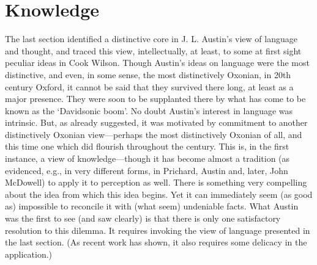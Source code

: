 \section{Knowledge} %
\label{sec:knowledge}


The last section identified a distinctive core in J. L. Austin’s view of language and thought, and traced this view, intellectually, at least, to some at first sight peculiar ideas in Cook Wilson. Though Austin’s ideas on language were the most distinctive, and even, in some sense, the most distinctively Oxonian, in 20th century Oxford, it cannot be said that they survived there long, at least as a major presence. They were soon to be supplanted there by what has come to be known as the ‘Davidsonic boom’. No doubt Austin’s interest in language was intrinsic. But, as already suggested, it was motivated by commitment to another distinctively Oxonian view---perhaps the most distinctively Oxonian of all, and this time one which did flourish throughout the century. This is, in the first instance, a view of knowledge---though it has become almost a tradition (as evidenced, e.g., in very different forms, in Prichard, Austin and, later, John McDowell) to apply it to perception as well. There is something very compelling about the idea from which this idea begins. Yet it can immediately seem (as good as) impossible to reconcile it with (what seem) undeniable facts. What Austin was the first to see (and saw clearly) is that there is only one satisfactory resolution to this dilemma. It requires invoking the view of language presented in the last section. (As recent work has shown, it also requires some delicacy in the application.)

